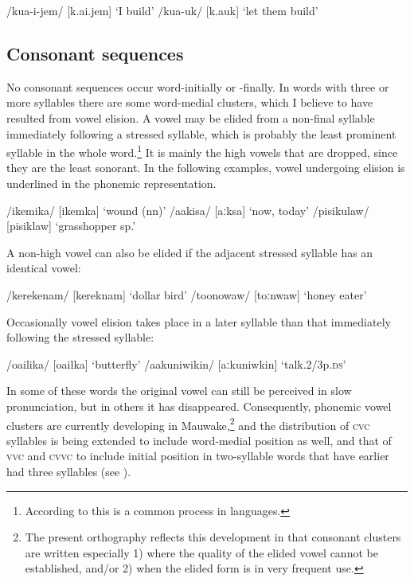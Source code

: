 \ea
\ea
/kua-i-jem/    [k{\textupsilon}.{{\textprimstress}}ai.jem]      `I build'
\ex
/kua-uk/      [k{\textupsilon}.{{\textprimstress}a}uk]      `let them build'
\z
\z

\subsection{Consonant sequences} \label{sec:2.2.3}

No consonant sequences occur word-initially or -finally. In words with three or more syllables there are some word-medial clusters, which I believe to have resulted from vowel elision.  A vowel may be elided from a non-final syllable immediately following a stressed syllable, which is probably the least prominent syllable in the whole word.\footnote{According to \citet[11]{Sommerstein1977} this is a common process in languages.} It is mainly the high vowels that are dropped, since they are the least sonorant. In the following examples, vowel undergoing elision is underlined in the phonemic representation.

\ea
\ea
/ikemika/  [i{{\textprimstress}kemka}]  `wound (nn)'
\ex
/aakisa/  [{{\textprimstress}aːksa}]  `now, today'
\ex
/pisikulaw/  [pi{{\textprimstress}siklaw}]  `grasshopper sp.'
\z
\z


A non-high vowel can also be elided if the adjacent stressed syllable has an identical vowel:

\ea
\ea
/kerekenam/  [ke{{\textprimstress}reknam}]  `dollar bird'
\ex
/toonowaw/  [{{\textprimstress}toːnwaw}]  `honey eater'
\z
\z


Occasionally vowel elision takes place in a later syllable than that immediately following the stressed syllable: 

\ea
\ea
/o{\textphi}a{\textphi}ilika/  [o{{\textprimstress}}{\textphi}a{\textphi}ilka]  `butterfly'
\ex
/aakuniwikin/  [aːkuniwkin]  `talk.2/3p.\textsc{ds}'
\z
\z

In some of these words the original vowel can still be perceived in slow pronunciation, but in others it has disappeared. Consequently, phonemic vowel clusters are currently developing in Mauwake,\footnote{The present orthography reflects this development in that consonant clusters are written especially 1) where the quality of the elided vowel cannot be established, and/or 2) when the elided form is in very frequent use.} and the distribution of \textsc{cvc} syllables is being extended to include word-medial position as well, and that of \textsc{vvc} and \textsc{cvvc} to include initial position in two-syllable words that have earlier had three syllables (see ).

